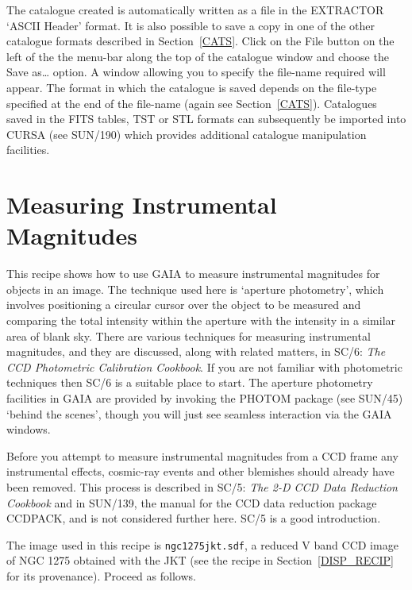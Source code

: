 \documentclass[twoside,11pt]{article}
\newcommand{\xref}[3]{#1}
\newcommand{\xlabel}[1]{}
\begin{document}
\begin{enumerate}
   The catalogue created is automatically written as a file in the
   EXTRACTOR `ASCII Header' format.  It is also possible to save a copy
   in one of the other catalogue formats described in Section~\ref{CATS}.
   Click on the {\sf File} button on the left of the the menu-bar along
   the top of the catalogue window and choose the {\sf Save as\ldots}
   option.  A window allowing you to specify the file-name required will
   appear.  The format in which the catalogue is saved depends on the
   file-type specified at the end of the file-name (again see
   Section~\ref{CATS}).  Catalogues saved in the FITS tables, TST or STL
   formats can subsequently be imported into CURSA (see
   \xref{SUN/190}{sun190}{}\cite{SUN190}) which provides additional
   catalogue manipulation facilities.

\end{enumerate}


\newpage
\section{\xlabel{PHOTOM_RECIP}\label{PHOTOM_RECIP}Measuring Instrumental
Magnitudes}

This recipe shows how to use GAIA to measure instrumental magnitudes for
objects in an image.  The technique used here is `aperture photometry',
which involves positioning a circular cursor over the object to be
measured and comparing the total intensity within the aperture with the
intensity in a similar area of blank sky.  There are various techniques
for measuring instrumental magnitudes, and they are discussed, along with
related matters, in \xref{SC/6: {\it The CCD Photometric Calibration
Cookbook}}{sc6}{}\/\cite{SC6}.  If you are not familiar with photometric
techniques then SC/6 is a suitable place to start.  The aperture photometry
facilities in GAIA are provided by invoking the PHOTOM package (see
\xref{SUN/45}{sun45}{}\cite{SUN45}) `behind the scenes', though you will
just see seamless interaction via the GAIA windows.

Before you attempt to measure instrumental magnitudes from a CCD frame
any instrumental effects, cosmic-ray events and other blemishes should
already have been removed.  This process is described in \xref{SC/5: {\it
The 2-D CCD Data Reduction Cookbook}}{sc5}{}\/\cite{SC5} and in
\xref{SUN/139}{sun139}{}\cite{SUN139}, the manual for the CCD data
reduction package CCDPACK, and is not considered further here.  SC/5 is
a good introduction.

The image used in this recipe is {\tt ngc1275jkt.sdf}, a reduced V band
CCD image of NGC 1275 obtained with the JKT (see the recipe in
Section~\ref{DISP_RECIP} for its provenance).  Proceed as follows.
\end{document}
